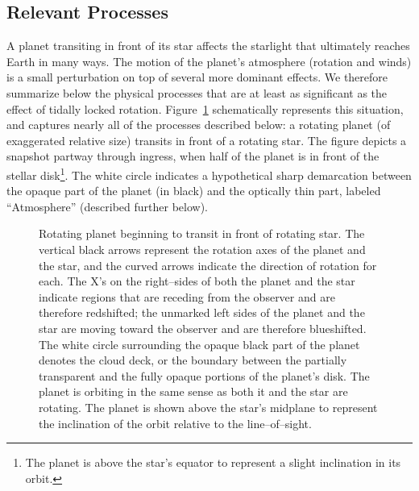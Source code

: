 \subsection{Relevant Processes}
\label{rot_ssec:processes}
A planet transiting in front of its star affects the starlight that
ultimately reaches Earth in many ways.  The motion of the planet's
atmosphere (rotation and winds) is a small perturbation on top of
several more dominant effects.  We therefore summarize below the
physical processes that are at least as significant as the effect of
tidally locked rotation.  Figure~\ref{rot_fig:schematic} schematically
represents this situation, and captures nearly all of the processes
described below: a rotating planet (of exaggerated relative size)
transits in front of a rotating star.  The figure depicts a snapshot
partway through ingress, when half of the planet is in front of the
stellar disk\footnote{The planet is above the star's equator to
represent a slight inclination in its orbit.}.  The white circle
indicates a hypothetical sharp demarcation between the opaque part of
the planet (in black) and the optically thin part, labeled
``Atmosphere'' (described further below).
\begin{figure}[p]
\caption[Rotating planet beginning to transit in front of rotating
star.]{Rotating planet beginning to transit in front of rotating star.
The vertical black arrows represent the rotation axes of the planet
and the star, and the curved arrows indicate the direction of rotation
for each.  The X's on the right--sides of both the planet and the star
indicate regions that are receding from the observer and are therefore
redshifted; the unmarked left sides of the planet and the star are
moving toward the observer and are therefore blueshifted.  The white
circle surrounding the opaque black part of the planet denotes the
cloud deck, or the boundary between the partially transparent and the
fully opaque portions of the planet's disk.  The planet is orbiting in
the same sense as both it and the star are rotating.  The planet is
shown above the star's midplane to represent the inclination of the
orbit relative to the line--of--sight.}
\label{rot_fig:schematic}
\end{figure}
\afterpage{\clearpage}

